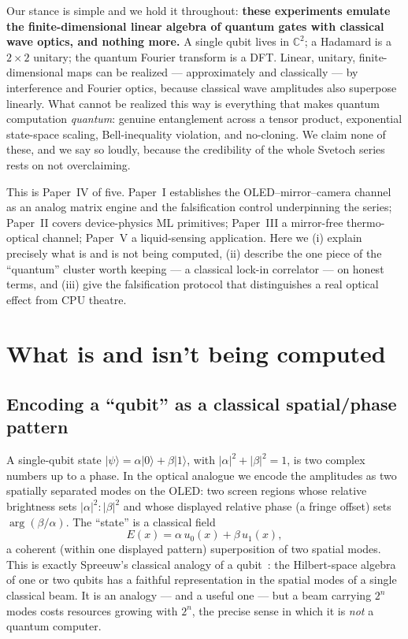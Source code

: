 \documentclass[11pt]{article}
\begin{document}
Our stance is simple and we hold it throughout: \textbf{these experiments emulate the
finite-dimensional linear algebra of quantum gates with classical wave optics, and nothing
more.} A single qubit lives in $\mathbb{C}^2$; a Hadamard is a $2\times2$ unitary; the quantum
Fourier transform is a DFT. Linear, unitary, finite-dimensional maps can be realized ---
approximately and classically --- by interference and Fourier optics, because classical wave
amplitudes also superpose linearly. What cannot be realized this way is everything that makes
quantum computation \emph{quantum}: genuine entanglement across a tensor product, exponential
state-space scaling, Bell-inequality violation, and no-cloning. We claim none of these, and we
say so loudly, because the credibility of the whole Svetoch series rests on not overclaiming.

This is Paper~IV of five. Paper~I establishes the OLED--mirror--camera channel as an analog
matrix engine and the falsification control underpinning the series; Paper~II covers
device-physics ML primitives; Paper~III a mirror-free thermo-optical channel; Paper~V a
liquid-sensing application. Here we (i) explain precisely what is and is not being computed,
(ii) describe the one piece of the ``quantum'' cluster worth keeping --- a classical lock-in
correlator --- on honest terms, and (iii) give the falsification protocol that distinguishes a
real optical effect from CPU theatre.

\section{What is and isn't being computed}
\subsection{Encoding a ``qubit'' as a classical spatial/phase pattern}
A single-qubit state $|\psi\rangle = \alpha|0\rangle + \beta|1\rangle$, with
$|\alpha|^2+|\beta|^2=1$, is two complex numbers up to a phase. In the optical analogue we
encode the amplitudes as two spatially separated modes on the OLED: two screen regions whose
relative brightness sets $|\alpha|^2{:}|\beta|^2$ and whose displayed relative phase (a fringe
offset) sets $\arg(\beta/\alpha)$. The ``state'' is a classical field
\begin{equation}
E(x) = \alpha\, u_0(x) + \beta\, u_1(x),
\end{equation}
a coherent (within one displayed pattern) superposition of two spatial modes. This is exactly
Spreeuw's classical analogy of a qubit~\cite{spreeuw}: the Hilbert-space algebra of one or two
qubits has a faithful representation in the spatial modes of a single classical beam. It is an
analogy --- and a useful one --- but a beam carrying $2^n$ modes costs resources growing with
$2^n$, the precise sense in which it is \emph{not} a quantum computer.
\end{document}
